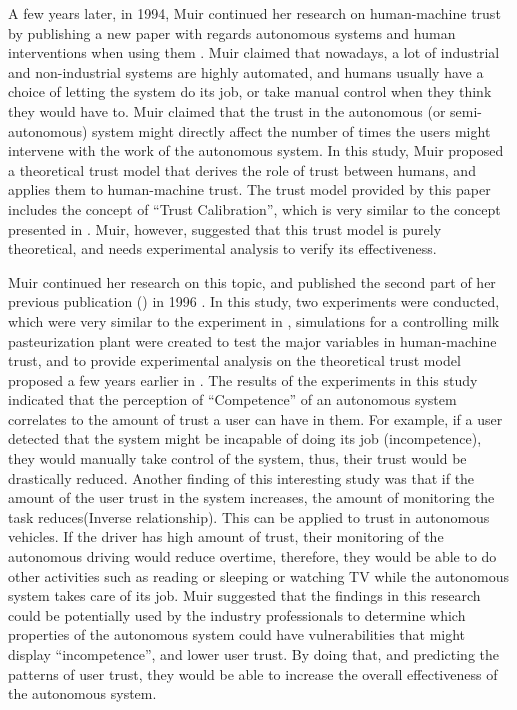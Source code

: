 \documentclass[runningheads,a4paper]{llncs}
\begin{document}
A few years later, in 1994, Muir continued her research on human-machine trust by publishing a new paper with regards autonomous systems and human interventions when using them \cite{muir1994trust}. Muir claimed that nowadays, a lot of industrial and non-industrial systems are highly automated, and humans usually have a choice of letting the system do its job, or take manual control when they think they would have to. Muir claimed that the trust in the autonomous (or semi-autonomous) system might directly affect the number of times the users might intervene with the work of the autonomous system. In this study, Muir proposed a theoretical trust model that derives the role of trust between humans, and applies them to human-machine trust. The trust model provided by this paper includes the concept of ``Trust Calibration'', which is very similar to the concept presented in \cite{muir1987trust}. Muir, however, suggested that this trust model is purely theoretical, and needs experimental analysis to verify its effectiveness.

Muir continued her research on this topic, and published the second part of her previous publication (\cite{muir1994trust}) in 1996 \cite{muir1996trust}. In this study, two experiments were conducted, which were very similar to the experiment in \cite{lee1992trust}, simulations for a controlling milk pasteurization plant were created to test the major variables in human-machine trust, and to provide experimental analysis on the theoretical trust model proposed a few years earlier in \cite{muir1994trust}. The results of the experiments in this study indicated that the perception of ``Competence'' of an autonomous system correlates to the amount of trust a user can have in them. For example, if a user detected that the system might be incapable of doing its job (incompetence), they would manually take control of the system, thus, their trust would be drastically reduced. Another finding of this interesting study was that if the amount of the user trust in the system increases, the amount of monitoring the task reduces(Inverse relationship). This can be applied to trust in autonomous vehicles. If the driver has high amount of trust, their monitoring of the autonomous driving would reduce overtime, therefore, they would be able to do other activities such as reading or sleeping or watching TV while the autonomous system takes care of its job. Muir suggested that the findings in this research could be potentially used by the industry professionals to determine which properties of the autonomous system could have vulnerabilities that might display ``incompetence'', and lower user trust. By doing that, and predicting the patterns of user trust, they would be able to increase the overall effectiveness of the autonomous system.
\end{document}
